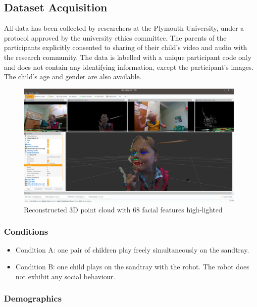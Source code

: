 \documentclass{article}
\begin{document}
\subsection{Dataset Acquisition}

All data has been collected by researchers at the Plymouth University, under a
protocol approved by the university ethics committee. The parents of the
participants explicitly consented to sharing of their child's video and audio
with the research community. The data is labelled with a unique participant code
only and does not contain any identifying information, except the participant's
images. The child's age and gender are also available.

\begin{figure}
    \centering
    \includegraphics[width=0.9\linewidth]{3d-point-cloud-facial-features}
    \caption{Reconstructed 3D point cloud with 68 facial features high-lighted}
    \label{fig|pointcloud}
\end{figure}

\subsubsection{Conditions}\label{conditions}

\begin{itemize}
\item
  Condition A: one pair of children play freely  simultaneously on the
  sandtray.
\item
  Condition B: one child plays on the sandtray with the robot. The robot does
  not exhibit any social behaviour.
\end{itemize}

\subsubsection{Demographics}\label{demographics}
\end{document}
